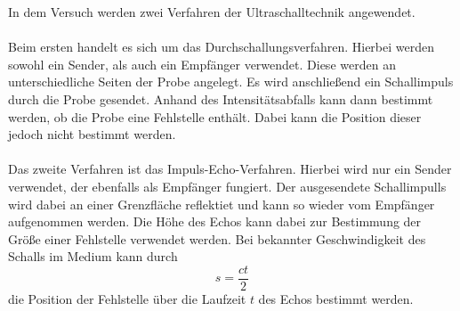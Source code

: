 \label{sec:Ultraschallverfahren}
In dem Versuch werden zwei Verfahren der Ultraschalltechnik angewendet.\\ \\
Beim ersten handelt es sich um das Durchschallungsverfahren. Hierbei werden sowohl ein Sender, als auch ein Empfänger verwendet. Diese werden an unterschiedliche
Seiten der Probe angelegt. Es wird anschließend ein Schallimpuls durch die Probe gesendet. Anhand des Intensitätsabfalls kann dann bestimmt werden, ob die Probe eine
Fehlstelle enthält. Dabei kann die Position dieser jedoch nicht bestimmt werden.\\ \\
Das zweite Verfahren ist das Impuls-Echo-Verfahren. Hierbei wird nur ein Sender verwendet, der ebenfalls als Empfänger fungiert. Der ausgesendete Schallimpulls wird dabei
an einer Grenzfläche reflektiet und kann so wieder vom Empfänger aufgenommen werden. Die Höhe des Echos kann dabei zur Bestimmung der Größe einer Fehlstelle verwendet
werden. Bei bekannter Geschwindigkeit des Schalls im Medium kann durch
\begin{equation}
    \label{eqn:Strecke}
    s = \frac{ct}{2}
\end{equation}
die Position der Fehlstelle über die Laufzeit $t$ des Echos bestimmt werden.
